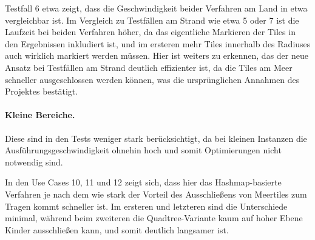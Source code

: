 \documentclass[%
			paper=a4,%
			DIV12,
			liststotoc,
			bibtotoc,
			draft=false,%
			titlepage,
			numbers=noendperiod
			]{scrartcl}
\begin{document}
Testfall 6 etwa zeigt, dass die Geschwindigkeit beider Verfahren am Land in etwa vergleichbar ist.
Im Vergleich zu Testfällen am Strand wie etwa 5 oder 7 ist die Laufzeit bei beiden Verfahren höher, da das eigentliche Markieren der Tiles in den Ergebnissen inkludiert ist, und im ersteren mehr Tiles innerhalb des Radiuses auch wirklich markiert werden müssen.
Hier ist weiters zu erkennen, das der neue Ansatz bei Testfällen am Strand deutlich effizienter ist, da die Tiles am Meer schneller ausgeschlossen werden können, was die ursprünglichen Annahmen des Projektes bestätigt.

\paragraph{Kleine Bereiche.}
Diese sind in den Tests weniger stark berücksichtigt, da bei kleinen Instanzen die Ausführungsgeschwindigkeit ohnehin hoch und somit Optimierungen nicht notwendig sind.

In den Use Cases 10, 11 und 12 zeigt sich, dass hier das Hashmap-basierte Verfahren je nach dem wie stark der Vorteil des Ausschließens von Meertiles zum Tragen kommt schneller ist. Im ersteren und letzteren sind die Unterschiede minimal, während beim zweiteren die Quadtree-Variante kaum auf hoher Ebene Kinder ausschließen kann, und somit deutlich langsamer ist.
\end{document}
